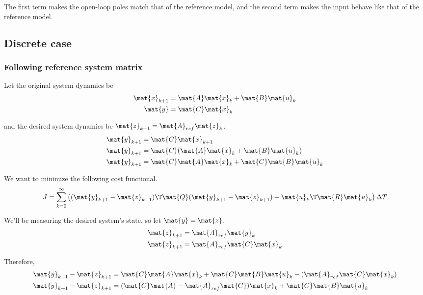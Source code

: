 The first term makes the open-loop poles match that of the reference model, and
the second term makes the input behave like that of the reference model.

\subsection{Discrete case}

\subsubsection{Following reference system matrix}

Let the original system dynamics be
\begin{align*}
  \mat{x}_{k+1} &= \mat{A}\mat{x}_k + \mat{B}\mat{u}_k \\
  \mat{y} &= \mat{C}\mat{x}_k
\end{align*}

and the desired system dynamics be $\mat{z}_{k+1} = \mat{A}_{ref}\mat{z}_k$.
\begin{align*}
  \mat{y}_{k+1} &= \mat{C}\mat{x}_{k+1} \\
  \mat{y}_{k+1} &= \mat{C}(\mat{A}\mat{x}_k + \mat{B}\mat{u}_k) \\
  \mat{y}_{k+1} &= \mat{C}\mat{A}\mat{x}_k + \mat{C}\mat{B}\mat{u}_k
\end{align*}

We want to minimize the following cost functional.
\begin{equation*}
  J = \sum_{k=0}^\infty \left((\mat{y}_{k+1} - \mat{z}_{k+1})\T \mat{Q}
    (\mat{y}_{k+1} - \mat{z}_{k+1}) + \mat{u}_k\T\mat{R}\mat{u}_k\right)
    \Delta T
\end{equation*}

We'll be measuring the desired system's state, so let $\mat{y} = \mat{z}$.
\begin{align*}
  \mat{z}_{k+1} &= \mat{A}_{ref}\mat{y}_k \\
  \mat{z}_{k+1} &= \mat{A}_{ref}\mat{C}\mat{x}_k
\end{align*}

Therefore,
\begin{align*}
  \mat{y}_{k+1} - \mat{z}_{k+1} &=
    \mat{C}\mat{A}\mat{x}_k + \mat{C}\mat{B}\mat{u}_k -
    (\mat{A}_{ref}\mat{C}\mat{x}_k) \\
  \mat{y}_{k+1} - \mat{z}_{k+1} &=
    (\mat{C}\mat{A} - \mat{A}_{ref}\mat{C})\mat{x}_k + \mat{C}\mat{B}\mat{u}_k
\end{align*}


